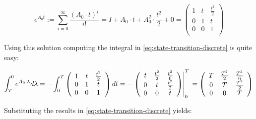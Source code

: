 \documentclass[english,ngerman]{KITreprt}
\begin{document}
\begin{equation}
e^{A_0 t} := \sum^{\infty}_{i=0} \frac{(A_0 \cdot t)^i}{i!} = I + A_0 \cdot t + A_0^2 \cdot \frac{t^2}{2} + 0
=
\left(\begin{array}{ccc}
1 & t & \frac{t^2}{2}\\
0 & 1 & t \\
0 & 0 & 1 \\
\end{array}\right)
\end{equation}

Using this solution computing the integral in
\ref{eq:state-transition-discrete} is quite easy:

\begin{equation}
\int^{0}_{T} e^{A_0 \cdot \lambda} d\lambda =  -\int^{T}_{0} \left(\begin{array}{ccc}1 & t & \frac{t^2}{2}\\0 & 1 & t\\ 0 & 0 & 1\end{array}\right) dt
                                            =  -\left.\left(\begin{array}{ccc} %
                                                          t & \frac{t^2}{2} & \frac{t^3}{6} \\ %
                                                          0 & t             & \frac{t^2}{2} \\ %
                                                          0 & 0             & t %
                                                 \end{array}\right)\right|_{0}^{T}\\
                                            =   \left(\begin{array}{ccc} %
                                                          T & \frac{T^2}{2} & \frac{T^3}{6} \\ %
                                                          0 & T             & \frac{T^2}{2} \\ %
                                                          0 & 0             & T %
                                                \end{array}\right)
\end{equation}

Substituting the results in \ref{eq:state-transition-discrete} yields:
\end{document}
